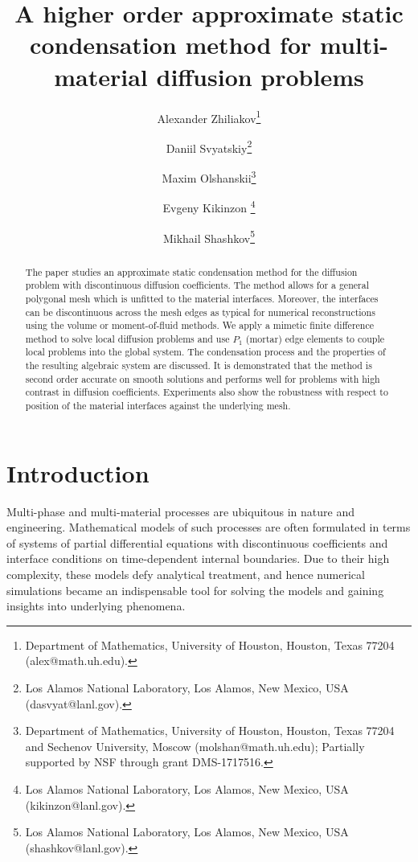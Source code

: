 \documentclass[12pt]{article}
\title{A higher order approximate static condensation method for multi-material diffusion problems}
\author{
	Alexander Zhiliakov\thanks{Department of Mathematics, University of Houston, Houston, Texas 77204 (alex@math.uh.edu).}
	\and Daniil Svyatskiy\thanks{Los Alamos National Laboratory, Los Alamos,
		New Mexico, USA (dasvyat@lanl.gov).}
	\and
	Maxim Olshanskii\thanks{Department of Mathematics, University of Houston, Houston, Texas 77204 and Sechenov University, Moscow  (molshan@math.uh.edu); Partially supported by NSF through grant  DMS-1717516.}
	\and Evgeny Kikinzon \thanks{Los Alamos National Laboratory, Los Alamos,
		New Mexico, USA (kikinzon@lanl.gov).}
	\and Mikhail Shashkov\thanks{Los Alamos National Laboratory, Los Alamos,
		New Mexico, USA (shashkov@lanl.gov).}
}
\newcommand{\Sasha}[1]{\colorbox{Cyan}{\textbf{Sasha}:} #1}
\begin{document}
	
	\maketitle
	
	\let\oldtabular\tabular
	\renewcommand{\tabular}[1][1.5]{\def\arraystretch{#1}\oldtabular}
	
	
	\begin{abstract}
		The paper studies an approximate static condensation method for the diffusion problem with discontinuous diffusion coefficients. The method allows for a general polygonal mesh which is unfitted to the material interfaces. Moreover, the interfaces can be discontinuous across the mesh edges as typical for numerical reconstructions using the volume or moment-of-fluid methods.  We apply a mimetic finite difference method to solve local diffusion problems and use $P_1$ (mortar) edge elements to couple local problems into the global system. The condensation process and the properties of the resulting algebraic system are discussed. It is demonstrated that the method is second order accurate on smooth solutions and performs well for problems with high contrast in diffusion coefficients. Experiments also show the robustness with respect to position of the material interfaces against the underlying mesh.
	\end{abstract}
	
	
	\section{Introduction}
	
	Multi-phase and multi-material processes are ubiquitous in nature and engineering.
	Mathematical models of such processes are often formulated in terms of systems of partial differential equations with discontinuous coefficients and interface conditions on time-dependent internal boundaries.
	Due to their high complexity, these models defy analytical treatment, and hence numerical simulations became an indispensable tool for solving the models and gaining insights into underlying phenomena.
	
\end{document}
